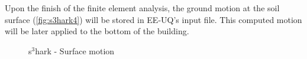 Upon the finish of the finite element analysis, the ground motion at the soil surface (\autoref{fig:s3hark4}) will be stored in EE-UQ's input file.
This computed motion will be later applied to the bottom of the building.

\begin{figure}[!htbp]
  \caption{s$^3$hark - Surface motion }
  \label{fig:s3hark4}
\end{figure}









